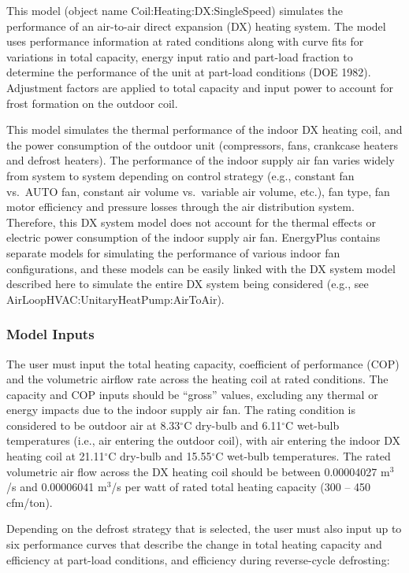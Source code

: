 This model (object name Coil:Heating:DX:SingleSpeed) simulates the performance of an air-to-air direct expansion (DX) heating system. The model uses performance information at rated conditions along with curve fits for variations in total capacity, energy input ratio and part-load fraction to determine the performance of the unit at part-load conditions (DOE 1982).~ Adjustment factors are applied to total capacity and input power to account for frost formation on the outdoor coil.

This model simulates the thermal performance of the indoor DX heating coil, and the power consumption of the outdoor unit (compressors, fans, crankcase heaters and defrost heaters). The performance of the indoor supply air fan varies widely from system to system depending on control strategy (e.g., constant fan vs.~AUTO fan, constant air volume vs.~variable air volume, etc.), fan type, fan motor efficiency and pressure losses through the air distribution system. Therefore, this DX system model does not account for the thermal effects or electric power consumption of the indoor supply air fan. EnergyPlus contains separate models for simulating the performance of various indoor fan configurations, and these models can be easily linked with the DX system model described here to simulate the entire DX system being considered (e.g., see AirLoopHVAC:UnitaryHeatPump:AirToAir).

\subsubsection{Model Inputs}\label{model-inputs-2}

The user must input the total heating capacity, coefficient of performance (COP) and the volumetric airflow rate across the heating coil at rated conditions. The capacity and COP inputs should be ``gross'' values, excluding any thermal or energy impacts due to the indoor supply air fan. The rating condition is considered to be outdoor air at 8.33\(^{\circ}\)C dry-bulb and 6.11\(^{\circ}\)C wet-bulb temperatures (i.e., air entering the outdoor coil), with air entering the indoor DX heating coil at 21.11\(^{\circ}\)C dry-bulb and 15.55\(^{\circ}\)C wet-bulb temperatures. The rated volumetric air flow across the DX heating coil should be between 0.00004027 m\(^{3}\)/s and 0.00006041 m\(^{3}\)/s per watt of rated total heating capacity (300 -- 450 cfm/ton).

Depending on the defrost strategy that is selected, the user must also input up to six performance curves that describe the change in total heating capacity and efficiency at part-load conditions, and efficiency during reverse-cycle defrosting:

